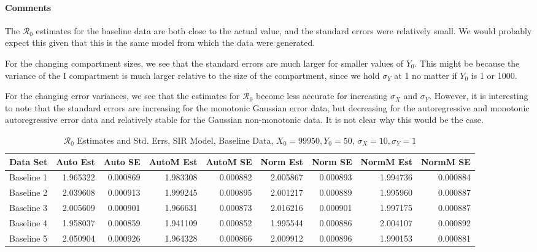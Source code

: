 \documentclass[12pt]{article}
\newcommand{\rr}{\ensuremath{\mathcal{R}_0}}
\begin{document}
\paragraph{Comments}

The $\rr$ estimates for the baseline data are both close to the actual value, and the standard errors were relatively small. We would probably expect this given that this is the same model from which the data were generated. 

For the changing compartment sizes, we see that the standard errors are much larger for smaller values of $Y_0$. This might be because the variance of the I compartment is much larger relative to the size of the compartment, since we hold $\sigma_Y$ at 1 no matter if $Y_0$ is 1 or 1000. 

For the changing error variances, we see that the estimates for $\rr$ become less accurate for increasing $\sigma_X$ and $\sigma_Y$. However, it is interesting to note that the standard errors are increasing for the monotonic Gaussian error data, but decreasing for the autoregressive and monotonic autoregressive error data and relatively stable for the Gaussian non-monotonic data. It is not clear why this would be the case.


\begin{table}[H]
	\caption{$\rr$ Estimates and Std. Errs, SIR Model, 
		Baseline Data, $X_0 = 99950, Y_0 = 50$, 
		$\sigma_X = 10, \sigma_Y = 1$}
	\begin{footnotesize}
		\hskip -1cm
		\begin{tabular}{l|r|r|r|r|r|r|r|r}
			\hline
			Data Set & Auto Est & Auto SE & AutoM Est & AutoM SE & Norm Est & Norm SE & NormM Est & NormM SE\\
			\hline
			Baseline 1 & 1.965322 & 0.000869 & 1.983308 & 0.000882 & 2.005867 & 0.000893 & 1.994736 & 0.000884\\
			\hline
			Baseline 2 & 2.039608 & 0.000913 & 1.999245 & 0.000895 & 2.001217 & 0.000889 & 1.995960 & 0.000887\\
			\hline
			Baseline 3 & 2.005609 & 0.000901 & 1.966631 & 0.000873 & 2.016216 & 0.000901 & 1.997175 & 0.000887\\
			\hline
			Baseline 4 & 1.958037 & 0.000859 & 1.941109 & 0.000852 & 1.995544 & 0.000886 & 2.004107 & 0.000892\\
			\hline
			Baseline 5 & 2.050904 & 0.000926 & 1.964328 & 0.000866 & 2.009912 & 0.000896 & 1.990153 & 0.000881\\
			\hline
		\end{tabular}
	\end{footnotesize}
\end{table}
\end{document}
